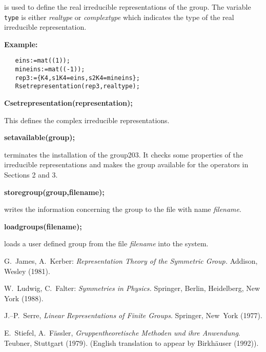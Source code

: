 is used to define the real irreducible representations of the group.
The variable {\tt type} is either {\em realtype} or {\em complextype} 
which indicates the type of the real irreducible representation.

{\bf Example:}
\begin{verbatim}
   eins:=mat((1));
   mineins:=mat((-1));
   rep3:={K4,s1K4=eins,s2K4=mineins};
   Rsetrepresentation(rep3,realtype);
\end{verbatim}

{\bf Csetrepresentation(representation);}

This defines the complex irreducible representations.

{\bf setavailable(group);}

terminates the installation of the group203. It checks some properties of the 
irreducible representations and makes the group available for the
operators in Sections 2 and 3.

{\bf storegroup(group,filename);}

writes the information concerning the group to the file with name
{\em filename}.

{\bf loadgroups(filename);}

loads a user defined group from the file {\em filename} into
the system.

\begin{thebibliography}{5}

 G.\ James, A.\ Kerber: {\it Representation Theory
of the Symmetric Group.} Addison, Wesley (1981).

 W.\ Ludwig, C.\ Falter: {\it Symmetries in Physics.}
Springer, Berlin, Heidelberg, New York (1988).

 J.--P.\ Serre, {\it Linear Representations of Finite
Groups}. Springer, New~York (1977).

 E.\  Stiefel, A.\  F{\"a}ssler, {\it Gruppentheoretische
Methoden und ihre Anwendung}. Teubner, Stuttgart (1979). 
(English translation to appear by Birkh\"auser (1992)).

\end{thebibliography}

